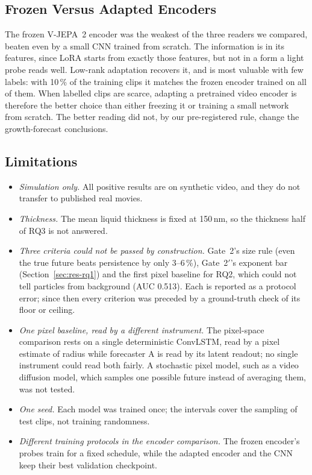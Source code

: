 \subsection{Frozen Versus Adapted Encoders}

The frozen V-JEPA~2 encoder was the weakest of the three readers we compared, beaten
even by a small CNN trained from scratch. The information is in its features, since LoRA
starts from exactly those features, but not in a form a light probe reads well. Low-rank
adaptation recovers it, and is most valuable with few labels: with 10\,\% of the training
clips it matches the frozen encoder trained on all of them. When labelled clips are scarce, adapting a pretrained video encoder is therefore the better
choice than either freezing it or training a small network from scratch. The better
reading did not, by our pre-registered rule, change the growth-forecast conclusions.

\subsection{Limitations}
\label{sec:limitations}

\begin{itemize}
  \item \emph{Simulation only.} All positive results are on synthetic video, and they
    do not transfer to published real movies.
  \item \emph{Thickness.} The mean liquid thickness is fixed at 150\,nm, so the
    thickness half of RQ3 is not answered.
  \item \emph{Three criteria could not be passed by construction.} Gate~2's size rule
    (even the true future beats persistence by only 3--6\,\%), Gate~2$'$'s exponent bar
    (Section~\ref{sec:res-rq1}) and the first pixel baseline for RQ2, which could not
    tell particles from background (AUC 0.513). Each is reported as a protocol error;
    since then every criterion was preceded by a ground-truth check of its floor or
    ceiling.
  \item \emph{One pixel baseline, read by a different instrument.} The pixel-space
    comparison rests on a single deterministic ConvLSTM, read by a pixel estimate of
    radius while forecaster A is read by its latent readout; no single instrument could
    read both fairly. A stochastic pixel model, such as a video diffusion model, which
    samples one possible future instead of averaging them, was not tested.
  \item \emph{One seed.} Each model was trained once; the intervals cover the sampling of
    test clips, not training randomness.
  \item \emph{Different training protocols in the encoder comparison.} The frozen
    encoder's probes train for a fixed schedule, while the adapted encoder and the CNN
    keep their best validation checkpoint.
\end{itemize}

